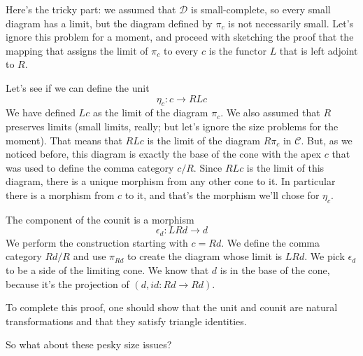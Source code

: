\documentclass[11pt]{amsart}
\newcommand{\cat}[1]{\mathcal{#1}}
\begin{document}
Here's the tricky part: we assumed that $\cat D$ is small-complete, so every small diagram has a limit, but the diagram defined by $\pi_c$ is not necessarily small. Let's ignore this problem for a moment, and proceed with sketching the proof that the mapping that assigns the limit of $\pi_c$ to every $c$ is the functor $L$ that is left adjoint to $R$. 

Let's see if we can define the unit
\[ \eta_c : c \to R L c\]
We have defined $L c$ as the limit of the diagram $\pi_c$. We also assumed that $R$ preserves limits (small limits, really; but let's ignore the size problems for the moment). That means that $R L c$ is the limit of the diagram $R \pi_c$ in $\cat C$. But, as we noticed before, this diagram is exactly the base of the cone with the apex $c$ that was used to define the comma category $c/R$. Since $R L c$ is the limit of this diagram, there is a unique morphism from any other cone to it. In particular there is a morphism from $c$ to it, and that's the morphism we'll chose for $\eta_c$. 

The component of the counit is a morphism
\[\epsilon_d : L R d \to d \]
We perform the construction starting with $c = R d$. We define the comma category $R d / R$ and use $\pi_{R d}$ to create the diagram whose limit is $L R d$. We pick $\epsilon_d$ to be a side of the limiting cone. We know that $d$ is in the base of the cone, because it's the projection of $(d, id \colon R d \to R d)$. 

To complete this proof, one should show that the unit and counit are natural transformations and that they satisfy triangle identities. 

So what about these pesky size issues? 
\end{document}
